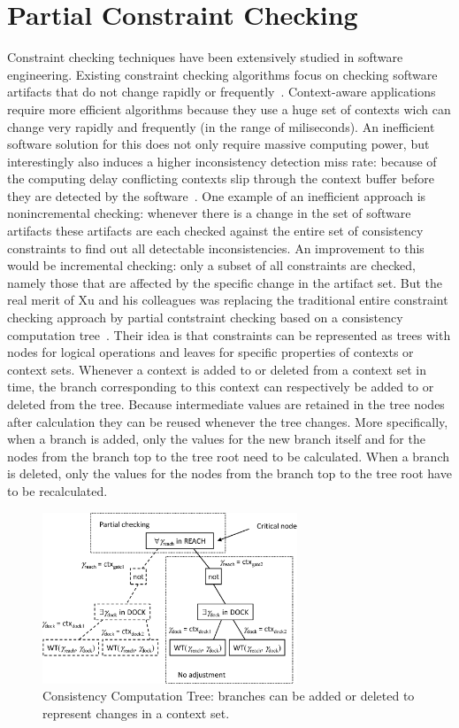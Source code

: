 \documentclass[journal]{vgtc}                %
\begin{document}
\section{Partial Constraint Checking}
Constraint checking techniques have been extensively studied in software engineering. Existing constraint checking algorithms focus on checking software artifacts that do not change rapidly or frequently~\cite{xu:2010:PCC}. Context-aware applications require more efficient algorithms because they use a huge set of contexts wich can change very rapidly and frequently (in the range of miliseconds). An inefficient software solution for this does not only require massive computing power, but interestingly also induces a higher inconsistency detection miss rate: because of the computing delay conflicting contexts slip through the context buffer before they are detected by the software~\cite{xu:2010:PCC}. One example of an inefficient approach is nonincremental checking: whenever there is a change in the set of software artifacts these artifacts are each checked against the entire set of consistency constraints to find out all detectable inconsistencies. An improvement to this would be incremental checking: only a subset of all constraints are checked, namely those that are affected by the specific change in the artifact set. But the real merit of Xu and his colleagues was replacing the traditional entire constraint checking approach by partial contstraint checking based on a consistency computation tree~\cite{xu:2010:PCC}. Their idea is that constraints can be represented as trees with nodes for logical operations and leaves for specific properties of contexts or context sets. Whenever a context is added to or deleted from a context set in time, the branch corresponding to this context can respectively be added to or deleted from the tree. Because intermediate values are retained in the tree nodes after calculation they can be reused whenever the tree changes. More specifically, when a branch is added, only the values for the new branch itself and for the nodes from the branch top to the tree root need to be calculated. When a branch is deleted, only the values for the nodes from the branch top to the tree root have to be recalculated. 

\begin{figure}[htb]
  \centering
  \includegraphics[width=3in]{cons_comp_tree}
  \caption{Consistency Computation Tree: branches can be added or deleted to represent changes in a context set.}
  \label{fig:cct}
\end{figure}
\end{document}
